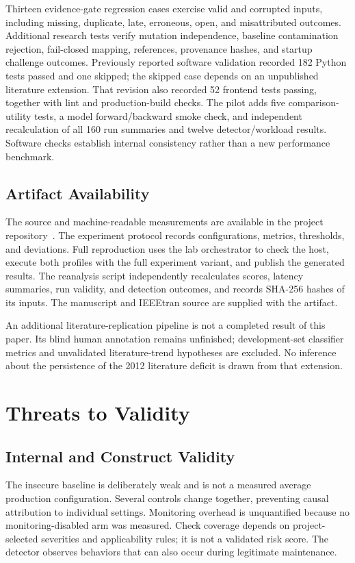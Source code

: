 \documentclass[conference,letterpaper]{IEEEtran}
\begin{document}
Thirteen evidence-gate regression cases exercise valid and corrupted inputs, including missing, duplicate, late, erroneous, open, and misattributed outcomes. Additional research tests verify mutation independence, baseline contamination rejection, fail-closed mapping, references, provenance hashes, and startup challenge outcomes. Previously reported software validation recorded 182 Python tests passed and one skipped; the skipped case depends on an unpublished literature extension. That revision also recorded 52 frontend tests passing, together with lint and production-build checks. The pilot adds five comparison-utility tests, a model forward/backward smoke check, and independent recalculation of all 160 run summaries and twelve detector/workload results. Software checks establish internal consistency rather than a new performance benchmark.

\subsection{Artifact Availability}
The source and machine-readable measurements are available in the project repository~\cite{artifact}. The experiment protocol records configurations, metrics, thresholds, and deviations. Full reproduction uses the lab orchestrator to check the host, execute both profiles with the full experiment variant, and publish the generated results. The reanalysis script independently recalculates scores, latency summaries, run validity, and detection outcomes, and records SHA-256 hashes of its inputs. The manuscript and IEEEtran source are supplied with the artifact.

An additional literature-replication pipeline is not a completed result of this paper. Its blind human annotation remains unfinished; development-set classifier metrics and unvalidated literature-trend hypotheses are excluded. No inference about the persistence of the 2012 literature deficit is drawn from that extension.

\section{Threats to Validity}
\subsection{Internal and Construct Validity}
The insecure baseline is deliberately weak and is not a measured average production configuration. Several controls change together, preventing causal attribution to individual settings. Monitoring overhead is unquantified because no monitoring-disabled arm was measured. Check coverage depends on project-selected severities and applicability rules; it is not a validated risk score. The detector observes behaviors that can also occur during legitimate maintenance.
\end{document}
